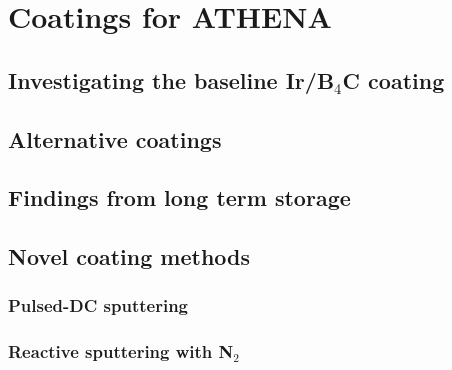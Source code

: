 \chapter{Coatings for ATHENA}


\section{Investigating the baseline Ir/B$_4$C coating}
\section{Alternative coatings}
\section{Findings from long term storage}
\section{Novel coating methods}
\subsection{Pulsed-DC sputtering}

\subsection{Reactive sputtering with N$_2$}
